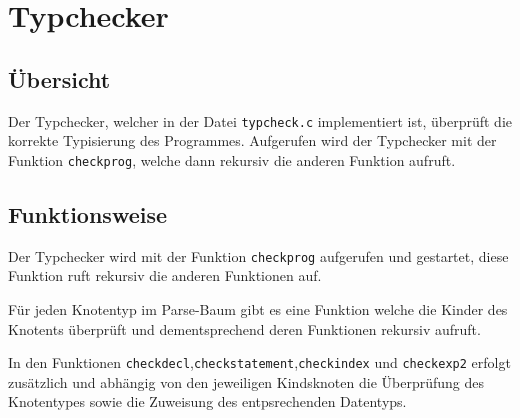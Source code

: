 \chapter{Typchecker}
\label{chap:typcheck}

\section{Übersicht}
\label{sec:typcheck_overview}
Der Typchecker, welcher in der Datei \texttt{typcheck.c} implementiert ist,
überprüft die korrekte Typisierung des Programmes. 
Aufgerufen wird der Typchecker mit der Funktion \texttt{checkprog}, welche dann rekursiv die
anderen Funktion aufruft.

\section{Funktionsweise}
\label{sec:typcheck_func}

Der Typchecker wird mit der Funktion \texttt{checkprog} aufgerufen und gestartet, diese Funktion
ruft rekursiv die anderen Funktionen auf.

Für jeden Knotentyp im Parse-Baum gibt es eine Funktion welche die Kinder des Knotents überprüft und dementsprechend deren Funktionen rekursiv aufruft.

In den Funktionen \texttt{checkdecl},\texttt{checkstatement},\texttt{checkindex} und \texttt{checkexp2} erfolgt zusätzlich und abhängig von den jeweiligen Kindsknoten die Überprüfung des Knotentypes sowie die Zuweisung des entpsrechenden Datentyps.